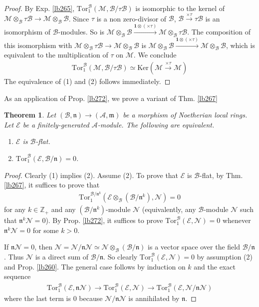 \documentclass[12pt,b5paper,notitlepage]{report}
\theoremstyle{definition}
\theoremstyle{plain}
\newtheorem{thm}[df]{Theorem}
\newcommand{\fk}{\mathfrak}
\newcommand{\mc}{\mathcal}
\newcommand{\id}{\mathbf{1}}
\newcommand{\Zbb}{\mathbb Z}
\newcommand{\Ker}{\mathrm{Ker}}
\newcommand{\Tor}{\mathrm{Tor}}
\newcommand{\nk}{\mathfrak n}
\numberwithin{equation}{section}
\begin{document}
\begin{proof}
By Exp. \ref{lb265}, $\Tor_1^{\mc B}(\mc M,\mc B/\tau\mc B)$ is isomorphic to the kernel of $\mc M\otimes_{\mc B}\tau\mc B\rightarrow \mc M\otimes_{\mc B}\mc B$. Since $\tau$ is a non zero-divisor of $\mc B$, $\mc B\xrightarrow{\times\tau}\tau\mc B$ is an isomorphism of $\mc B$-modules. So is $\mc M\otimes_{\mc B}\mc B\xrightarrow{\id\otimes(\times\tau)}\mc M\otimes_{\mc B}\tau\mc B$. The composition of this isomorphism with $\mc M\otimes_{\mc B}\tau\mc B\rightarrow \mc M\otimes_{\mc B}\mc B$ is $\mc M\otimes_{\mc B}\mc B\xrightarrow{\id\otimes(\times\tau)}\mc M\otimes_{\mc B}\mc B$, which is equivalent to the multiplication of $\tau$ on $\mc M$. We conclude
\begin{align}
\Tor_1^{\mc B}(\mc M,\mc B/\tau\mc B)\simeq\Ker(\mc M\xrightarrow{\times\tau}\mc M)
\end{align}
The equivalence of (1) and (2) follows immediately.
\end{proof}


As an application of Prop. \ref{lb272},  we prove a variant of Thm. \ref{lb267}

\begin{thm}\label{lb274}
Let $(\mc B,\fk n)\rightarrow(\mc A,\fk m)$ be a morphism of Noetherian local rings. Let $\mc E$ be a finitely-generated $\mc A$-module. The following are equivalent.
\begin{enumerate}[label=(\arabic*)]
\item $\mc E$ is $\mc B$-flat.
\item $\Tor_1^{\mc B}(\mc E,\mc B/\fk n)=0$.
\end{enumerate}
\end{thm}

\begin{proof}
Clearly (1) implies (2). Assume (2). To prove that $\mc E$ is $\mc B$-flat, by Thm. \ref{lb267}, it suffices to prove that
\begin{align*}
\Tor_1^{\mc B/\nk^k}(\mc E\otimes_{\mc B}(\mc B/\nk^k),\mc N)=0
\end{align*}
for any $k\in\Zbb_+$ and any $(\mc B/\nk^k)$-module $\mc N$ (equivalently, any $\mc B$-module $\mc N$ such that $\nk^k\mc N=0$). By Prop. \ref{lb272}, it suffices to prove $\Tor_1^{\mc B}(\mc E,\mc N)=0$ whenever $\nk^k\mc N=0$ for some $k>0$.


If $\nk\mc N=0$, then $\mc N=\mc N/\fk n\mc N\simeq\mc N\otimes_{\mc B}(\mc B/\fk n)$ is a vector space over the field $\mc B/\fk n$. Thus $\mc N$ is a direct sum of $\mc B/\fk n$. So clearly $\Tor_1^{\mc B}(\mc E,\mc N)=0$ by assumption (2) and Prop. \ref{lb260}. The general case follows by induction on $k$ and the exact sequence
\begin{align*}
\Tor_1^{\mc B}(\mc E,\nk\mc N)\rightarrow \Tor_1^{\mc B}(\mc E,\mc N)\rightarrow\Tor_1^{\mc B}(\mc E,\mc N/\nk\mc N)
\end{align*}
where the last term is $0$ because $\mc N/\nk\mc N$ is annihilated by $\nk$.
\end{proof}
\end{document}
